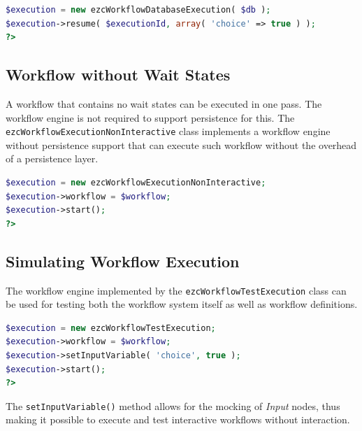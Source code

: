 \begin{lstlisting}[language=PHP,firstnumber=14]
$execution = new ezcWorkflowDatabaseExecution( $db );
$execution->resume( $executionId, array( 'choice' => true ) );
?>
\end{lstlisting}

\subsection{Workflow without Wait States}

A workflow that contains no wait states can be executed in one pass. The
workflow engine is not required to support persistence for this. The
\texttt{ezcWorkflowExecutionNonInteractive} class implements a workflow
engine without persistence support that can execute such workflow without
the overhead of a persistence layer.

\begin{lstlisting}[language=PHP,firstnumber=11]
$execution = new ezcWorkflowExecutionNonInteractive;
$execution->workflow = $workflow;
$execution->start();
?>
\end{lstlisting}

\subsection{Simulating Workflow Execution}

The workflow engine implemented by the \texttt{ezcWorkflowTestExecution}
class can be used for testing both the workflow system itself as well as
workflow definitions.

\begin{lstlisting}[language=PHP,firstnumber=11]
$execution = new ezcWorkflowTestExecution;
$execution->workflow = $workflow;
$execution->setInputVariable( 'choice', true );
$execution->start();
?>
\end{lstlisting}

The \texttt{setInputVariable()} method allows for the mocking of
\emph{Input} nodes, thus making it possible to execute and test interactive
workflows without interaction.
